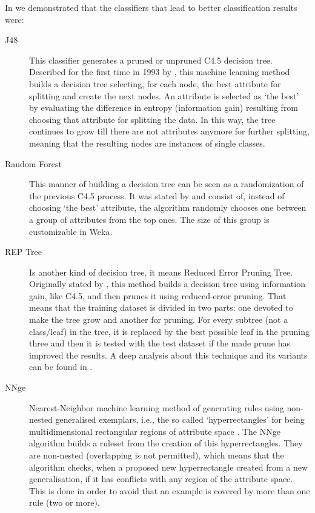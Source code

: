 \documentclass{llncs}
\begin{document}
In \cite{ECTA} we demonstrated that the classifiers that lead to better classification results were:

\begin{description}
   \item[J48] This classifier generates a pruned or unpruned C4.5 decision tree. Described for the first time in 1993 by \cite{Quinlan1993}, this machine learning method builds a decision tree selecting, for each node, the best attribute for splitting and create the next nodes. An attribute is selected as `the best' by evaluating the difference in entropy (information gain) resulting from choosing that attribute for splitting the data. In this way, the tree continues to grow till there are not attributes anymore for further splitting, meaning that the resulting nodes are instances of single classes. 
   \item[Random Forest] This manner of building a decision tree can be seen as a randomization of the previous C4.5 process. It was stated by \cite{Breiman2001} and consist of, instead of choosing `the best' attribute, the algorithm randomly chooses one between a group of attributes from the top ones. The size of this group is customizable in Weka.
   \item[REP Tree] Is another kind of decision tree, it means Reduced Error Pruning Tree. Originally stated by \cite{Quinlan1987}, this method builds a decision tree using information gain, like C4.5, and then prunes it using reduced-error pruning. That means that the training dataset is divided in two parts: one devoted to make the tree grow and another for pruning. For every subtree (not a class/leaf) in the tree, it is replaced by the best possible leaf in the pruning three and then it is tested with the test dataset if the made prune has improved the results. A deep analysis about this technique and its variants can be found in \cite{Elomaa2001}.
   \item[NNge] Nearest-Neighbor machine learning method of generating rules using non-nested generalised exemplars, i.e., the so called `hyperrectangles' for being multidimensional rectangular regions of attribute space \cite{Martin1995}. The NNge algorithm builds a ruleset from the creation of this hyperrectangles. They are non-nested (overlapping is not permitted), which means that the algorithm checks, when a proposed new hyperrectangle created from a new generalisation, if it has conflicts with any region of the attribute space. This is done in order to avoid that an example is covered by more than one rule (two or more).

\end{description}
\end{document}
